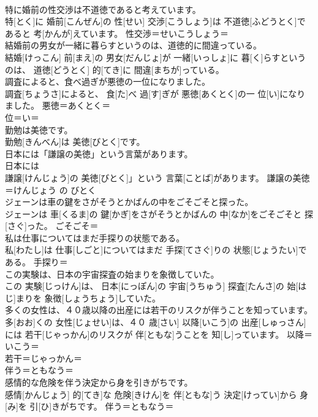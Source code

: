 \documentclass[8pt]{extreport}
\begin{document}
\begin{CJK}{UTF8}{min}
\\	特に婚前の性交渉は不道徳であると考えています。	
\\	特[とく]に 婚前[こんぜん]の 性[せい] 交渉[こうしょう]は 不道徳[ふどうとく]であると 考[かんが]えています。	性交渉＝せいこうしょう＝ 
\\	結婚前の男女が一緒に暮らすというのは、道徳的に間違っている。	
\\	結婚[けっこん] 前[まえ]の 男女[だんじょ]が 一緒[いっしょ]に 暮[く]らすというのは、 道徳[どうとく] 的[てき]に 間違[まちが]っている。	
\\	調査によると、食べ過ぎが悪徳の一位になりました。	
\\	調査[ちょうさ]によると、 食[た]べ 過[す]ぎが 悪徳[あくとく]の一 位[い]になりました。	悪徳＝あくとく＝ 
\\	位＝い＝ 
\\	勤勉は美徳です。	
\\	勤勉[きんべん]は 美徳[びとく]です。	
\\	日本には「謙譲の美徳」という言葉があります。	
\\	日本には
\\	謙譲[けんじょう]の 美徳[びとく]」という 言葉[ことば]があります。	謙譲の美徳＝けんじょう の びとく
\\	ジェーンは車の鍵をさがそうとかばんの中をごそごそと探った。	
\\	ジェーンは 車[くるま]の 鍵[かぎ]をさがそうとかばんの 中[なか]をごそごそと 探[さぐ]った。	ごそごそ＝ 
\\	私は仕事についてはまだ手探りの状態である。	
\\	私[わたし]は 仕事[しごと]についてはまだ 手探[てさぐ]りの 状態[じょうたい]である。	手探り＝ 
\\	この実験は、日本の宇宙探査の始まりを象徴していた。	
\\	この 実験[じっけん]は、 日本[にっぽん]の 宇宙[うちゅう] 探査[たんさ]の 始[はじ]まりを 象徴[しょうちょう]していた。	
\\	多くの女性は、４０歳以降の出産には若干のリスクが伴うことを知っています。	
\\	多[おお]くの 女性[じょせい]は、４０ 歳[さい] 以降[いこう]の 出産[しゅっさん]には 若干[じゃっかん]のリスクが 伴[ともな]うことを 知[し]っています。	以降＝いこう＝ 
\\	若干＝じゃっかん＝ 
\\	伴う＝ともなう＝ 
\\	感情的な危険を伴う決定から身を引きがちです。	
\\	感情[かんじょう] 的[てき]な 危険[きけん]を 伴[ともな]う 決定[けってい]から 身[み]を 引[ひ]きがちです。	伴う＝ともなう＝ 

\end{CJK}
\end{document}
